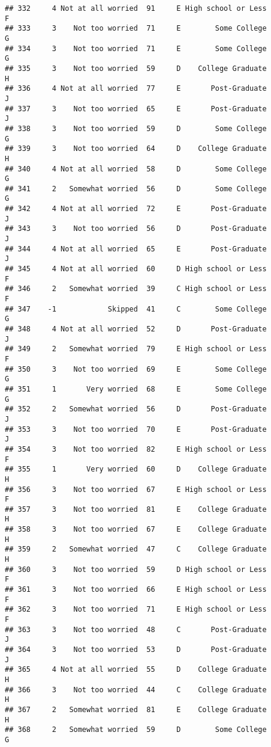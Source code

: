 \documentclass[
]{article}
\begin{document}
\begin{verbatim}
## 332     4 Not at all worried  91     E High school or Less         F
## 333     3    Not too worried  71     E        Some College         G
## 334     3    Not too worried  71     E        Some College         G
## 335     3    Not too worried  59     D    College Graduate         H
## 336     4 Not at all worried  77     E       Post-Graduate         J
## 337     3    Not too worried  65     E       Post-Graduate         J
## 338     3    Not too worried  59     D        Some College         G
## 339     3    Not too worried  64     D    College Graduate         H
## 340     4 Not at all worried  58     D        Some College         G
## 341     2   Somewhat worried  56     D        Some College         G
## 342     4 Not at all worried  72     E       Post-Graduate         J
## 343     3    Not too worried  56     D       Post-Graduate         J
## 344     4 Not at all worried  65     E       Post-Graduate         J
## 345     4 Not at all worried  60     D High school or Less         F
## 346     2   Somewhat worried  39     C High school or Less         F
## 347    -1            Skipped  41     C        Some College         G
## 348     4 Not at all worried  52     D       Post-Graduate         J
## 349     2   Somewhat worried  79     E High school or Less         F
## 350     3    Not too worried  69     E        Some College         G
## 351     1       Very worried  68     E        Some College         G
## 352     2   Somewhat worried  56     D       Post-Graduate         J
## 353     3    Not too worried  70     E       Post-Graduate         J
## 354     3    Not too worried  82     E High school or Less         F
## 355     1       Very worried  60     D    College Graduate         H
## 356     3    Not too worried  67     E High school or Less         F
## 357     3    Not too worried  81     E    College Graduate         H
## 358     3    Not too worried  67     E    College Graduate         H
## 359     2   Somewhat worried  47     C    College Graduate         H
## 360     3    Not too worried  59     D High school or Less         F
## 361     3    Not too worried  66     E High school or Less         F
## 362     3    Not too worried  71     E High school or Less         F
## 363     3    Not too worried  48     C       Post-Graduate         J
## 364     3    Not too worried  53     D       Post-Graduate         J
## 365     4 Not at all worried  55     D    College Graduate         H
## 366     3    Not too worried  44     C    College Graduate         H
## 367     2   Somewhat worried  81     E    College Graduate         H
## 368     2   Somewhat worried  59     D        Some College         G

\end{verbatim}
\end{document}
